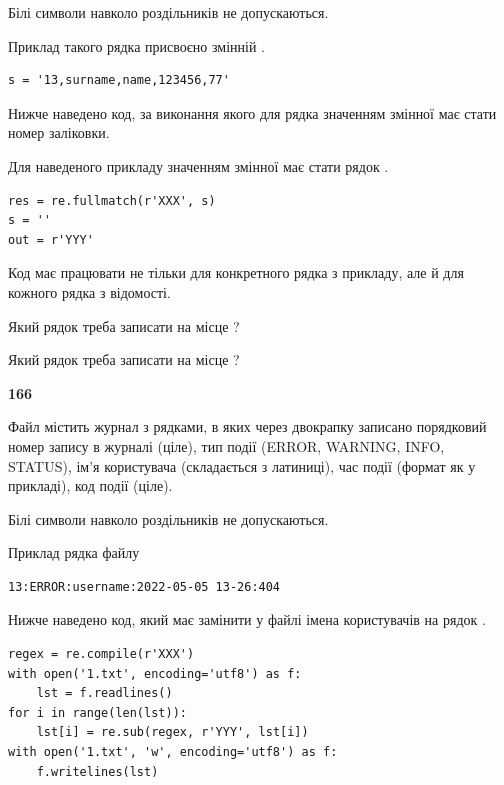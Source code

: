 Білі символи навколо роздільників не допускаються.

Приклад такого рядка присвоєно змінній .



\begin{verbatim}
s = '13,surname,name,123456,77'
\end{verbatim}


Нижче наведено код, за виконання якого для рядка  значенням змінної  має стати номер заліковки.

Для наведеного прикладу значенням змінної  має стати рядок  .



\begin{verbatim}
res = re.fullmatch(r'XXX', s)
s = ''
out = r'YYY'
\end{verbatim}


Код має працювати не тільки для конкретного рядка з прикладу, але й для кожного рядка з відомості.




Який рядок треба записати на місце  ?\par
\vspace{5mm}


Який рядок треба записати на місце  ?\par


\newpage

{\begin {center}\textbf{ 166}\end {center}}\par
Файл  містить журнал з рядками, в яких через двокрапку записано поряд\-ко\-вий номер запису в журналі (ціле), тип події (ERROR, WARNING, INFO, STATUS), ім'я користувача (складається з латиниці), час події (фор\-мат як у прикладі), код події (ціле).

Білі символи навколо роздільників не допускаються.

Приклад рядка файлу



\begin{verbatim}
13:ERROR:username:2022-05-05 13-26:404
\end{verbatim}


Нижче наведено код, який має замінити у файлі імена користувачів на рядок .



\begin{verbatim}
regex = re.compile(r'XXX')
with open('1.txt', encoding='utf8') as f:
    lst = f.readlines()
for i in range(len(lst)):
    lst[i] = re.sub(regex, r'YYY', lst[i])
with open('1.txt', 'w', encoding='utf8') as f:
    f.writelines(lst)
\end{verbatim}







